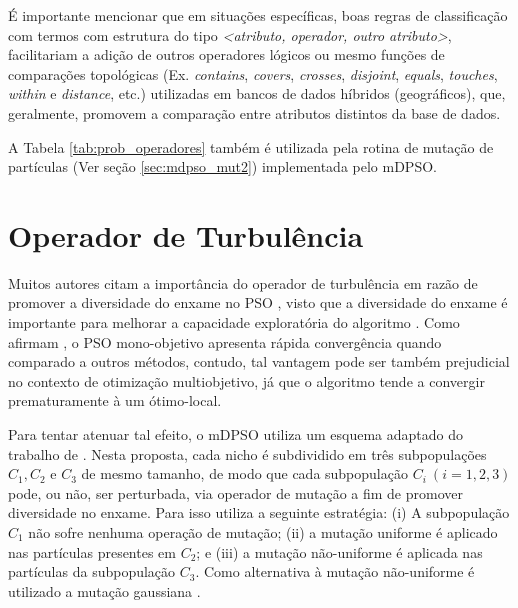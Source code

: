 \documentclass[
	12pt,				%
	openany,			%
	oneside,	
	a4paper,			%
	brazil,				%
	]{unimontes-ppgmsc-abntex2}
\begin{document}
É importante mencionar que em situações específicas, boas regras de classificação com termos com estrutura do tipo \textit{<atributo, operador, outro atributo>}, facilitariam a adição de outros operadores lógicos ou mesmo funções de comparações topológicas (Ex. {\em contains}, {\em covers}, {\em crosses}, {\em disjoint}, {\em equals}, {\em touches}, {\em within} e {\em distance}, etc.) utilizadas em bancos de dados híbridos (geográficos), que, geralmente, promovem a comparação entre atributos distintos da base de dados.

\begin{table}[ht] %
\setlength{\arrayrulewidth}{.2em}
\vspace{12pt}
\centering{}
\caption{Probabilidade de seleção dos operadores relacionais usada pelas rotinas de geração de partículas e de mutação do mDPSO.}
\label{tab:prob_operadores}
\end{table}

A Tabela \ref{tab:prob_operadores} também é utilizada pela rotina de mutação de partículas (Ver seção \ref{sec:mdpso_mut2}) implementada pelo mDPSO.

\section{Operador de Turbulência}
\label{sec:mdpso_oper_turb}

Muitos autores citam a importância do operador de turbulência em razão de promover a diversidade do enxame no PSO \cite{Parsopoulos_2008}, visto que a diversidade do enxame é importante para melhorar a capacidade exploratória do algoritmo \cite{Reyes_2006}. Como afirmam , o PSO mono-objetivo apresenta rápida convergência quando comparado a outros métodos, contudo, tal vantagem pode ser também prejudicial no contexto de otimização multiobjetivo, já que o algoritmo tende a convergir prematuramente à um ótimo-local.

Para tentar atenuar tal efeito, o mDPSO utiliza um esquema adaptado do trabalho de  . Nesta proposta, cada nicho é subdividido em três subpopulações $C_1, C_2$ e $C_3$ de mesmo tamanho, de modo que cada subpopulação $C_i \ (i=1,2,3)$ pode, ou não, ser perturbada, via operador de mutação a fim de promover diversidade no enxame. Para isso utiliza a seguinte estratégia: (i) A subpopulação $C_1$ não sofre nenhuma operação de mutação; (ii) a mutação uniforme é aplicado nas partículas presentes em $C_2$; e (iii) a mutação não-uniforme é aplicada nas partículas da subpopulação $C_3$. Como alternativa à mutação não-uniforme é utilizado a mutação gaussiana \cite{Higashi_2003}. 
\end{document}
